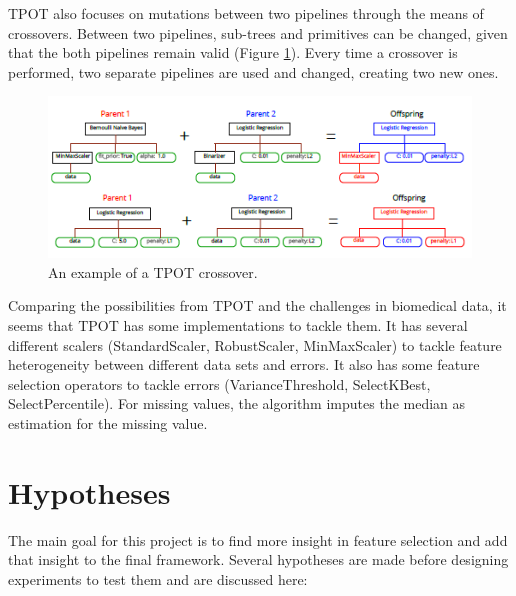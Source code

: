 \documentclass[10pt,a4paper]{article}
\begin{document}
	TPOT also focuses on mutations between two pipelines through the means of crossovers. Between two pipelines, sub-trees and primitives can be changed, given that the both pipelines remain valid (Figure \ref{fig:TPOTCrossover}). Every time a crossover is performed, two separate pipelines are used and changed, creating two new ones.
	
	\begin{figure}[h!]
		\includegraphics[scale=1]{TPOTCrossover.png}
		\caption{An example of a TPOT crossover\cite{Gijsbers2017Thesis}.}
		\label{fig:TPOTCrossover}
	\end{figure}
	
	Comparing the possibilities from TPOT and the challenges in biomedical data, it seems that TPOT has some implementations to tackle them. It has several different scalers (StandardScaler, RobustScaler, MinMaxScaler) to tackle feature heterogeneity between different data sets and errors. It also has some feature selection operators to tackle errors (VarianceThreshold, SelectKBest, SelectPercentile). For missing values, the algorithm imputes the median as estimation for the missing value.
	
	\newpage
	\section{Hypotheses}
	\label{sec:hypotheses}
	
	The main goal for this project is to find more insight in feature selection and add that insight to the final framework. Several hypotheses are made before designing experiments to test them and are discussed here:
	
\end{document}
